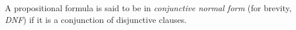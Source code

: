 

\setcounter{section}{1}
\setcounter{subsection}{5}
\setcounter{dfn}{17}

\begin{dfn}
A propositional formula is said to be in \emph{conjunctive normal form} (for brevity, \emph{DNF})
if it is a conjunction of disjunctive clauses.
\end{dfn}


